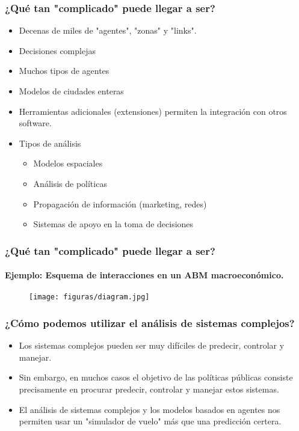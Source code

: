 \documentclass[11pt]{beamer}
\begin{document}
\begin{frame}
\frametitle{¿Qué tan "complicado" puede llegar a ser?}
\begin{itemize}
	\item Decenas de miles de "agentes", "zonas" y "links".
	\item Decisiones complejas
	\item Muchos tipos de agentes
	\item Modelos de ciudades enteras
	\item Herramientas adicionales (extensiones) permiten la integración con otros software.
	\item Tipos de análisis
	\begin{itemize}
		\item Modelos espaciales
		\item Análisis de políticas
		\item Propagación de información (marketing, redes)
		\item Sistemas de apoyo en la toma de decisiones
	\end{itemize}
\end{itemize}
\end{frame}

\begin{frame}
	\frametitle{¿Qué tan "complicado" puede llegar a ser?}
	\framesubtitle{Ejemplo: Esquema de interacciones en un ABM macroeconómico.}
\begin{figure}
	\centering
	\texttt{[image: figuras/diagram.jpg]}
	\label{fig:diagram}
\end{figure}

\end{frame}


\begin{frame}
\frametitle{¿Cómo podemos utilizar el análisis de sistemas complejos?}
\begin{itemize}
	\item Los sistemas complejos pueden ser muy difíciles de predecir, controlar y manejar.
	\item Sin embargo, en muchos casos el objetivo de las políticas públicas consiste precisamente en procurar predecir, controlar y manejar estos sistemas.
	\item El análisis de sistemas complejos y los modelos basados en agentes nos permiten usar un "simulador de vuelo" más que una predicción certera.
\end{itemize}
\end{frame}
\end{document}

